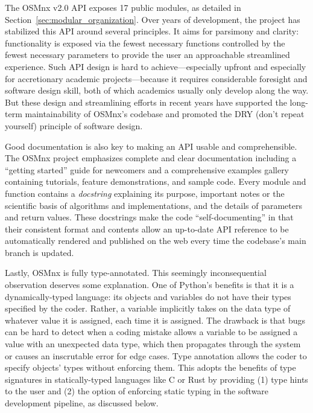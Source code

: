 \documentclass[12pt,letterpaper]{article} %
\begin{document}
The OSMnx v2.0 API exposes 17 public modules, as detailed in Section~\ref{sec:modular_organization}. Over years of development, the project has stabilized this API around several principles. It aims for parsimony and clarity: functionality is exposed via the fewest necessary functions controlled by the fewest necessary parameters to provide the user an approachable streamlined experience. Such API design is hard to achieve---especially upfront and especially for accretionary academic projects---because it requires considerable foresight and software design skill, both of which academics usually only develop along the way. But these design and streamlining efforts in recent years have supported the long-term maintainability of OSMnx's codebase and promoted the DRY (don't repeat yourself) principle of software design.

Good documentation is also key to making an API usable and comprehensible. The OSMnx project emphasizes complete and clear documentation including a \enquote{getting started} guide for newcomers and a comprehensive examples gallery containing tutorials, feature demonstrations, and sample code. Every module and function contains a \textit{docstring} explaining its purpose, important notes or the scientific basis of algorithms and implementations, and the details of parameters and return values. These docstrings make the code \enquote{self-documenting} in that their consistent format and contents allow an up-to-date API reference to be automatically rendered and published on the web every time the codebase's main branch is updated.

Lastly, OSMnx is fully type-annotated. This seemingly inconsequential observation deserves some explanation. One of Python's benefits is that it is a dynamically-typed language: its objects and variables do not have their types specified by the coder. Rather, a variable implicitly takes on the data type of whatever value it is assigned, each time it is assigned. The drawback is that bugs can be hard to detect when a coding mistake allows a variable to be assigned a value with an unexpected data type, which then propagates through the system or causes an inscrutable error for edge cases. Type annotation allows the coder to specify objects' types without enforcing them. This adopts the benefits of type signatures in statically-typed languages like C or Rust by providing (1) type hints to the user and (2) the option of enforcing static typing in the software development pipeline, as discussed below.
\end{document}
